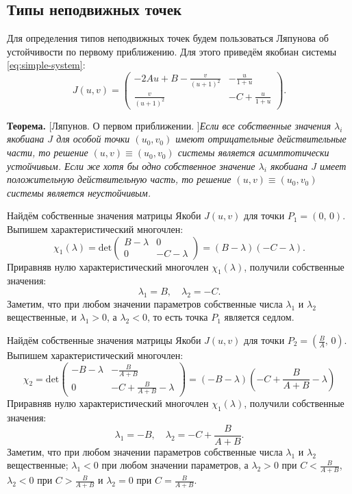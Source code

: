 \documentclass[a4paper, 11pt]{article}
\begin{document}
	\subsection{Типы неподвижных точек}
	Для определения типов неподвижных точек будем пользоваться Ляпунова об устойчивости по первому приближению. Для этого приведём якобиан системы \eqref{eq:simple-system}:
	\begin{equation}
		J(u, v) =
		\begin{pmatrix}
			-2Au+B-\frac{v}{(u+1)^2} & -\frac{u}{1 + u} \\
			\frac{v}{(u+1)^2}       & -C +\frac{u}{1 + u}
		\end{pmatrix}.
	\end{equation}

	\textbf{Теорема. }[Ляпунов. О первом приближении. ]\textit{Если все собственные значения $\lambda_i$ якобиана $J$ для особой точки $(u_0, v_0)$ имеют отрицательные действительные части, то решение $(u,v) \equiv (u_0,v_0)$ системы является асимптотически устойчивым. Если же хотя бы одно собственное значение $\lambda_i$ якобиана $J$ имеет положительную действительную часть, то решение $(u,v) \equiv (u_0, v_0)$ системы является неустойчивым.}

	Найдём собственные значения матрицы Якоби $J(u,v)$ для точки $P_1 = (0,\,0)$. Выпишем характеристический многочлен:
	$$
		\chi_{1}(\lambda)
		=
		\mathrm{det} \begin{pmatrix}
			B - \lambda & 0 \\
			0           & -C -\lambda
		\end{pmatrix}
		=
		(B - \lambda)(-C - \lambda).
	$$
	Приравняв нулю характеристический многочлен $\chi_1(\lambda)$, получили собственные значения:
	$$
		   \lambda_1 = B, \quad \lambda_2 = -C.	
	$$
	Заметим, что при любом значении параметров собственные числа $\lambda_1$ и $\lambda_2$ вещественные, и $\lambda_1 > 0$, а $\lambda_2 < 0$, то есть точка $P_1$ является седлом.

	Найдём собственные значения матрицы Якоби $J(u,v)$ для точки $P_2 = \left(\frac{B}{A},\,0\right)$. Выпишем характеристический многочлен:
	$$
				\chi_2=\mathrm{det}\begin{pmatrix}
						-B - \lambda & -\frac{B}{A+B} \\
						0 & -C + \frac{B}{A+B} - \lambda
				\end{pmatrix}
				=
				(-B - \lambda)\left(
						-C + \frac{B}{A+B} - \lambda
				\right)
	$$
	Приравняв нулю характеристический многочлен $\chi_1(\lambda)$, получили собственные значения:
	$$
		   \lambda_1 = -B, \quad \lambda_2 = -C + \frac{B}{A+B}.     
	$$
	Заметим, что при любом значении параметров собственные числа $\lambda_1$ и $\lambda_2$ вещественные; $\lambda_1 < 0$ при любом значении параметров, а $\lambda_2 > 0$ при $C < \frac{B}{A+B}$, $\lambda_2 < 0$ при $C > \frac{B}{A+B}$ и $\lambda_2 = 0$ при $C = \frac{B}{A+B}$.
\end{document}
